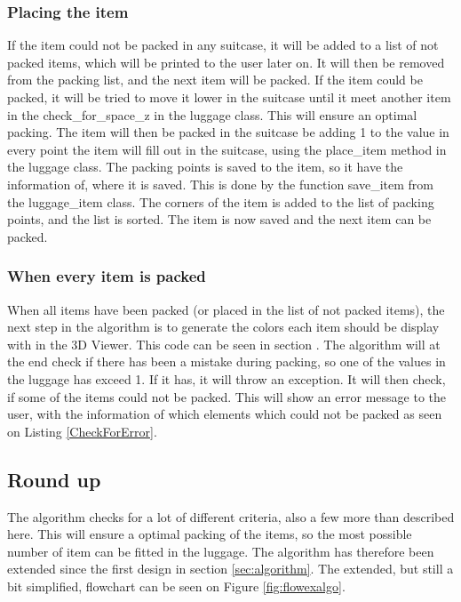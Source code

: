 \subsubsection{Placing the item}
If the item could not be packed in any suitcase, it will be added to a list of not packed items, which will be printed to the user later on. It will then be removed from the packing list, and the next item will be packed. If the item could be packed, it will be tried to move it lower in the suitcase until it meet another item in the check\_for\_space\_z in the luggage class. This will ensure an optimal packing. The item will then be packed in the suitcase be adding 1 to the value in every point the item will fill out in the suitcase, using the place\_item method in the luggage class. The packing points is saved to the item, so it have the information of, where it is saved. This is done by the function save\_item from the luggage\_item class. The corners of the item is added to the list of packing points, and the list is sorted. The item is now saved and the next item can be packed.
\subsubsection{When every item is packed}
When all items have been packed (or placed in the list of not packed items), the next step in the algorithm is to generate the colors each item should be display with in the 3D Viewer. This code can be seen in section .
The algorithm will at the end check if there has been a mistake during packing, so one of the values in the luggage has exceed 1. If it has, it will throw an exception. It will then check, if some of the items could not be packed. This will show an error message to the user, with the information of which elements which could not be packed as seen on Listing \ref{CheckForError}.

\subsection{Round up}
The algorithm checks for a lot of different criteria, also a few more than described here. This will ensure a optimal packing of the items, so the most possible number of item can be fitted in the luggage. The algorithm has therefore been extended since the first design in section \ref{sec:algorithm}. The extended, but still a bit simplified, flowchart can be seen on Figure \ref{fig:flowexalgo}.

